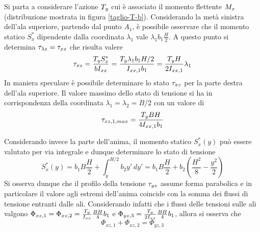 		
		Si parta a considerare l'azione $T_y$ cui è associato il momento flettente $M_x$ (distribuzione mostrata in figura \ref{taglio-T-b}). Considerando la metà sinistra dell'ala superiore, partendo dal punto $A_1$, è possibile osservare che il momento statico $S_x^*$ dipendente dalla coordinata $\lambda_1$ vale $\lambda_1 b_1 \frac H 2$. A questo punto si determina $\tau_{\lambda z} = \tau_{xz}$ che risulta valere
		\[ \tau_{xz} = \frac {T_y S_x^*}{bI_{xx}} = \frac{T_y \lambda_1 b_1 H/2}{I_{xx,1}b_1} = \frac{T_y H}{2 I_{xx,1}} \lambda_1 \]
		In maniera speculare è possibile determinare lo stato $\tau_{xz}$ per la parte destra dell'ala superiore. Il valore massimo dello stato di tensione si ha in corrispondenza della coordinata $\lambda_1 = \lambda_2 = B/2$ con un valore di 
		\[ \tau_{xz,1,max} = \frac{T_y BH}{4 I_{xx,1}b_1} \]
		
		Considerando invece la parte dell'anima, il momento statico $S_x^*(y)$ può essere valutato per via integrale e dunque determinare lo stato di tensione
		\[ S_x^*(y) = b_1 B\frac H2 + \int_y^{H/2}b_2y'\, dy' = b_1 B \frac H 2 + b_2 \left(\frac{H^2}{8} - \frac{y^2}{2}\right)  \]
		Si osserva dunque che il profilo della tensione $\tau_{yz}$ assume forma parabolica e in particolare il valore agli estremi dell'anima coincide con la somma dei flussi di tensione entranti dalle ali. Considerando infatti che i flussi delle tensioni sulle ali valgono $\Phi_{xz,1} = \Phi_{xz,2} = \frac {T_y}{I_{xx}} \frac{BH}{4}b_1$ e $\Phi_{yz,3} = \frac {T_y} {2I_{xx}} \frac{BH} 4 b_1$, allora si osserva che
		\[ \Phi_{xz,1} + \Phi_{xz,2} = \Phi_{yz,3} \]
		
		
		
		
		
		
		
		
		
		
		
		
		
		
		
		
		
		
		
		
		
		
		
		
		
